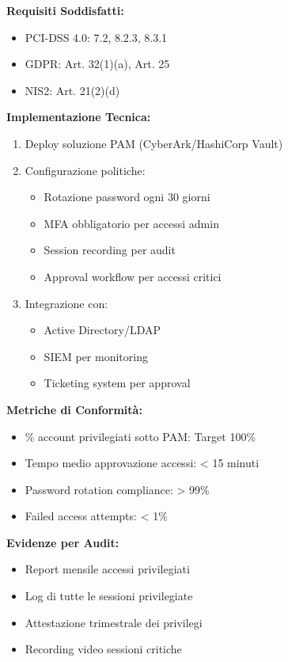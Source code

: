 \begin{tcolorbox}[
    colback=blue!5!white,
    colframe=blue!75!black,
    title={\textbf{Controllo Unificato CU-001: Gestione Accessi Privilegiati}},
    fonttitle=\bfseries,
    boxrule=1.5pt,
    arc=2mm,
    breakable
]
\textbf{Requisiti Soddisfatti:}
\begin{itemize}
    \item PCI-DSS 4.0: 7.2, 8.2.3, 8.3.1
    \item GDPR: Art. 32(1)(a), Art. 25
    \item NIS2: Art. 21(2)(d)
\end{itemize}

\textbf{Implementazione Tecnica:}
\begin{enumerate}
    \item Deploy soluzione PAM (CyberArk/HashiCorp Vault)
    \item Configurazione politiche:
    \begin{itemize}
        \item Rotazione password ogni 30 giorni
        \item MFA obbligatorio per accessi admin
        \item Session recording per audit
        \item Approval workflow per accessi critici
    \end{itemize}
    \item Integrazione con:
    \begin{itemize}
        \item Active Directory/LDAP
        \item SIEM per monitoring
        \item Ticketing system per approval
    \end{itemize}
\end{enumerate}

\textbf{Metriche di Conformità:}
\begin{itemize}
    \item \% account privilegiati sotto PAM: Target 100\%
    \item Tempo medio approvazione accessi: < 15 minuti
    \item Password rotation compliance: > 99\%
    \item Failed access attempts: < 1\%
\end{itemize}

\textbf{Evidenze per Audit:}
\begin{itemize}
    \item Report mensile accessi privilegiati
    \item Log di tutte le sessioni privilegiate
    \item Attestazione trimestrale dei privilegi
    \item Recording video sessioni critiche
\end{itemize}


\end{tcolorbox}
